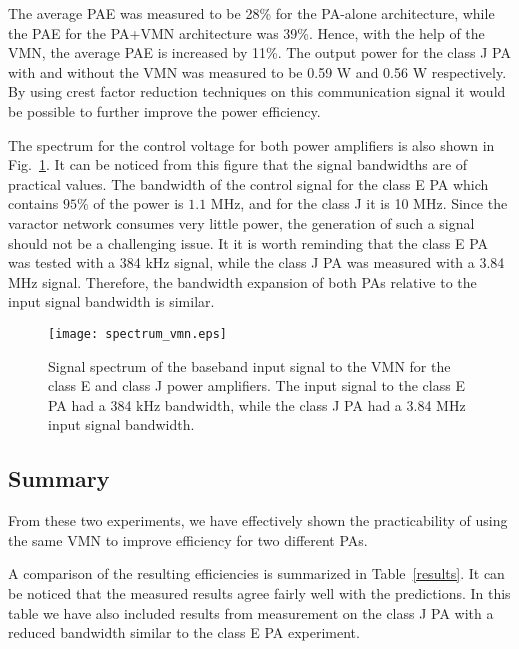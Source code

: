\documentclass[10pt,journal]{IEEEtran}
\begin{document}
The average PAE was measured to be 28\% for the PA-alone architecture, while the PAE for the PA+VMN architecture was 39\%. Hence, with the help of the VMN, the average PAE is increased by 11\%. The output power for the class J PA with and without the VMN was measured to be 0.59 W and 0.56 W respectively. By using crest factor reduction techniques on this communication signal it would be possible to further improve the power efficiency.

The spectrum for the control voltage for both power amplifiers is also shown in Fig.~\ref{spct_vmn}. It can be noticed from this figure that the signal bandwidths are of practical values. The bandwidth of the control signal for the class E PA which contains $95\%$ of the power is $1.1$ MHz, and for the class J it is 10 MHz. Since the varactor network consumes very little power, the generation of such a signal should not be a challenging issue. It it is worth reminding that the class E PA was tested with a 384 kHz signal, while the class J PA was measured with a 3.84 MHz signal. Therefore, the bandwidth expansion of both PAs relative to the input signal bandwidth is similar.

\begin{figure}
\centering
\texttt{[image: spectrum\_vmn.eps]}
\caption{Signal spectrum of the baseband input signal to the VMN for the class E and class J power amplifiers. The input signal to the class E PA had a 384 kHz bandwidth, while the class J PA had a 3.84 MHz input signal bandwidth.}
\label{spct_vmn}
\end{figure}

\subsection{Summary}
From these two experiments, we have effectively shown the practicability of using the same VMN to improve efficiency for two different PAs.

A comparison of the resulting efficiencies is summarized in Table~\ref{results}. It can be noticed that the measured results agree fairly well with the predictions. In this table we have also included results from measurement on the class J PA with a reduced bandwidth similar to the class E PA experiment.
\end{document}
